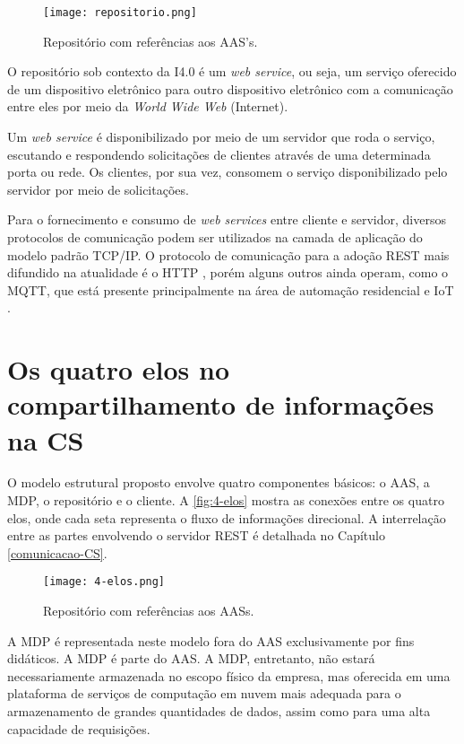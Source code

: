	\begin{figure}[htb]
		\centering
		\caption{Repositório com referências aos AAS's.}
		\label{fig:repositorio}
		\texttt{[image: repositorio.png]}
	\end{figure}
	
	O repositório sob contexto da I4.0 é um \textit{web service}, ou seja, um serviço oferecido de um dispositivo eletrônico para outro dispositivo eletrônico com a comunicação entre eles por meio da \textit{World Wide Web} (Internet).
	
	Um \textit{web service} é disponibilizado por meio de um servidor que roda o serviço, escutando e respondendo solicitações de clientes através de uma determinada porta ou rede. Os clientes, por sua vez, consomem o serviço disponibilizado pelo servidor por meio de solicitações.
	
	Para o fornecimento e consumo de \textit{web services} entre cliente e servidor, diversos protocolos de comunicação podem ser utilizados na camada de aplicação do modelo padrão TCP/IP. O protocolo de comunicação para a adoção REST mais difundido na atualidade é o HTTP \cite{gruner2016restful}, porém alguns outros ainda operam, como o MQTT, que está presente principalmente na área de automação residencial e IoT \cite{yokotani2016mqtt}.
	
\section{Os quatro elos no compartilhamento de informações na CS}
	
	O modelo estrutural proposto envolve quatro componentes básicos: o AAS, a MDP, o repositório e o cliente. A \autoref{fig:4-elos} mostra as conexões entre os quatro elos, onde cada seta representa o fluxo de informações direcional. A interrelação entre as partes envolvendo o servidor REST é detalhada no Capítulo \ref{comunicacao-CS}.
	
	\begin{figure}[htb]
		\centering
		\caption{Repositório com referências aos AASs.}
		\label{fig:4-elos}
		\texttt{[image: 4-elos.png]}
	\end{figure}
	
	A MDP é representada neste modelo fora do AAS exclusivamente por fins didáticos. A MDP é parte do AAS. A MDP, entretanto, não estará necessariamente armazenada no escopo físico da empresa, mas oferecida em uma plataforma de serviços de computação em nuvem mais adequada para o armazenamento de grandes quantidades de dados, assim como para uma alta capacidade de requisições.
	
